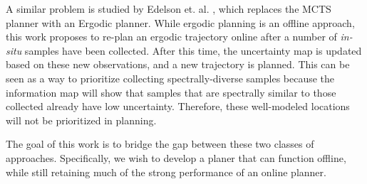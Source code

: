 A similar problem is studied by Edelson et. al. \cite{Edelson2020ErgodicGathering}, which replaces the MCTS planner with an Ergodic planner. While ergodic planning is an offline approach, this work proposes to re-plan an ergodic trajectory online after a number of \textit{in-situ} samples have been collected. After this time, the uncertainty map is updated based on these new observations, and a new trajectory is planned. This can be seen as a way to prioritize collecting spectrally-diverse samples because the information map will show that samples that are spectrally similar to those collected already have low uncertainty. Therefore, these well-modeled locations will not be prioritized in planning. 

The goal of this work is to bridge the gap between these two classes of approaches. Specifically, we wish to develop a planer that can function offline, while still retaining much of the strong performance of an online planner.






